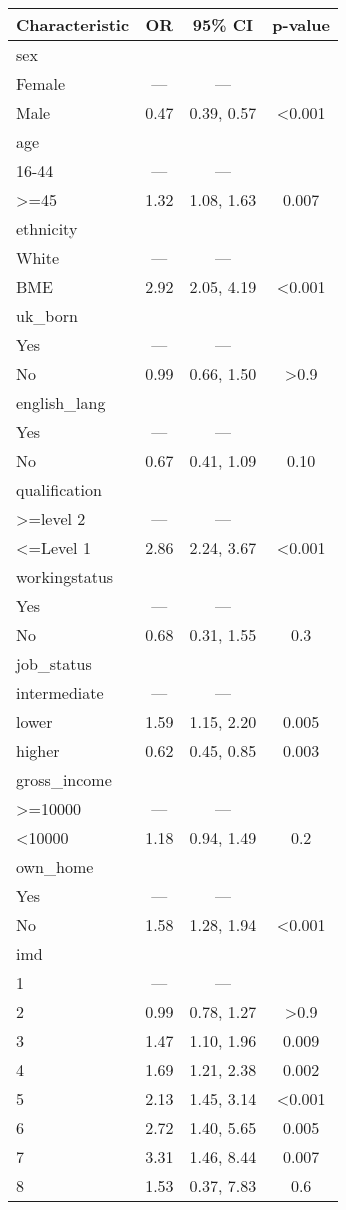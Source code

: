 \documentclass[
]{article}
\begin{document}
\begin{longtable}[]{@{}lccc@{}}
\toprule\noalign{}
\textbf{Characteristic} & \textbf{OR} & \textbf{95\% CI} &
\textbf{p-value} \\
\midrule\noalign{}
\endhead
\bottomrule\noalign{}
\endlastfoot
sex & & & \\
Female & --- & --- & \\
Male & 0.47 & 0.39, 0.57 & \textless0.001 \\
age & & & \\
16-44 & --- & --- & \\
\textgreater=45 & 1.32 & 1.08, 1.63 & 0.007 \\
ethnicity & & & \\
White & --- & --- & \\
BME & 2.92 & 2.05, 4.19 & \textless0.001 \\
uk\_born & & & \\
Yes & --- & --- & \\
No & 0.99 & 0.66, 1.50 & \textgreater0.9 \\
english\_lang & & & \\
Yes & --- & --- & \\
No & 0.67 & 0.41, 1.09 & 0.10 \\
qualification & & & \\
\textgreater=level 2 & --- & --- & \\
\textless=Level 1 & 2.86 & 2.24, 3.67 & \textless0.001 \\
workingstatus & & & \\
Yes & --- & --- & \\
No & 0.68 & 0.31, 1.55 & 0.3 \\
job\_status & & & \\
intermediate & --- & --- & \\
lower & 1.59 & 1.15, 2.20 & 0.005 \\
higher & 0.62 & 0.45, 0.85 & 0.003 \\
gross\_income & & & \\
\textgreater=10000 & --- & --- & \\
\textless10000 & 1.18 & 0.94, 1.49 & 0.2 \\
own\_home & & & \\
Yes & --- & --- & \\
No & 1.58 & 1.28, 1.94 & \textless0.001 \\
imd & & & \\
1 & --- & --- & \\
2 & 0.99 & 0.78, 1.27 & \textgreater0.9 \\
3 & 1.47 & 1.10, 1.96 & 0.009 \\
4 & 1.69 & 1.21, 2.38 & 0.002 \\
5 & 2.13 & 1.45, 3.14 & \textless0.001 \\
6 & 2.72 & 1.40, 5.65 & 0.005 \\
7 & 3.31 & 1.46, 8.44 & 0.007 \\
8 & 1.53 & 0.37, 7.83 & 0.6 \\
\end{longtable}
\end{document}
